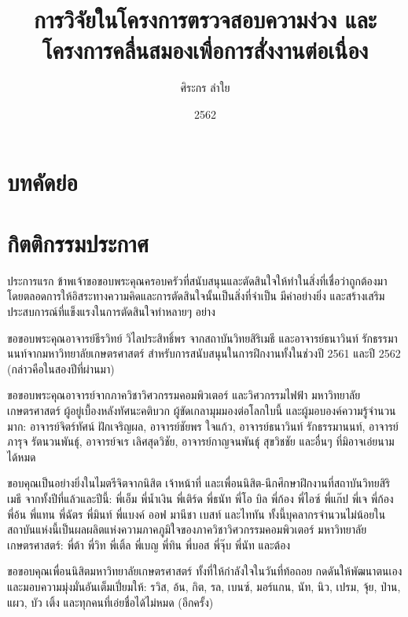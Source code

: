 \documentclass[16pt,a4]{internshipreport}
\title{การวิจัยในโครงการตรวจสอบความง่วง และโครงการคลื่นสมองเพื่อการสั่งงานต่อเนื่อง}
\date{2562}
\author{ศิระกร ลำใย}
\begin{document}
\maketitle

\chapter*{บทคัดย่อ}
\lipsum[2-4]

\chapter*{กิตติกรรมประกาศ}
ประการแรก ข้าพเจ้าขอขอบพระคุณครอบครัวที่สนับสนุนและตัดสินใจให้ทำในสิ่งที่เชื่อว่าถูกต้องมาโดยตลอดการให้อิสระทางความคิดและการตัดสินใจนั้นเป็นสิ่งที่จำเป็น มีค่าอย่างยิ่ง และสร้างเสริมประสบการณ์ที่แข็งแรงในการตัดสินใจทำหลายๆ อย่าง

ขอขอบพระคุณอาจารย์ธีรวิทย์ วิไลประสิทธิ์พร จากสถาบันวิทยสิริเมธี และอาจารย์ธนาวินท์ รักธรรมานนท์จากมหาวิทยาลัยเกษตรศาสตร์ สำหรับการสนับสนุนในการฝึกงานทั้งในช่วงปี 2561 และปี 2562 (กล่าวคือในสองปีที่ผ่านมา)

ขอขอบพระคุณอาจารย์จากภาควิชาวิศวกรรมคอมพิวเตอร์ และวิศวกรรมไฟฟ้า มหาวิทยาลัยเกษตรศาสตร์ ผู้อยู่เบื้องหลังทัศนะคติบวก ผู้ขัดเกลามุมมองต่อโลกใบนี้ และผู้มอบองค์ความรู้จำนวนมาก: อาจารย์จิตร์ทัศน์ ฝักเจริญผล, อาจารย์ชัยพร ใจแก้ว, อาจารย์ธนาวินท์ รักธรรมานนท์, อาจารย์ภารุจ รัตนวนพันธุ์, อาจารย์จเร เลิศสุดวิชัย, อาจารย์กาญจนพันธุ์ สุขวิชชัย และอื่นๆ ที่มิอาจเอ่ยนามได้หมด

ขอบคุณเป็นอย่างยิ่งในไมตรีจิตจากนิสิต เจ้าหน้าที่ และเพื่อนนิสิต-นึกศึกษาฝึกงานที่สถาบันวิทยสิริเมธี จากทั้งปีที่แล้วและปีนี้: พี่เอ็ม พี่น้ำเงิน พี่เติร์ด พี่ธนัท  พี่โอ บิล พี่ก้อง พี่ไอซ์ พี่แก๊ป พี่เจ พี่ก้อง พี่อ้น พี่แทน พี่ฉัตร พี่มินท์ พี่แบงค์ ออฟ มานีชา เบสท์ และไททัน ทั้งนี้บุคลากรจำนวนไม่น้อยในสถาบันแห่งนี้เป็นผลผลิตแห่งความภาคภูมิใจของภาควิชาวิศวกรรมคอมพิวเตอร์ มหาวิทยาลัยเกษตรศาสตร์: พี่ต้า พี่วิท พี่เติ้ล พี่เบญ พี่ทิน พี่บอส พี่จุ๊บ พี่นัท และต้อง

ขอขอบคุณเพื่อนนิสิตมหาวิทยาลัยเกษตรศาสตร์ ทั้งที่ให้กำลังใจในวันที่ท้อถอย
กดดันให้พัฒนาตนเอง และมอบความมุ่งมั่นอันเต็มเปี่ยมให้: รวิส, อ้น, กิต, รล, เบนซ์, มอร์แกน, นัท, นิว, เปรม, จุ้ย, ป่าน, แผว, บัว เติ้ง
และทุกคนที่เอ่ยชื่อได้ไม่หมด (อีกครั้ง)
\end{document}

